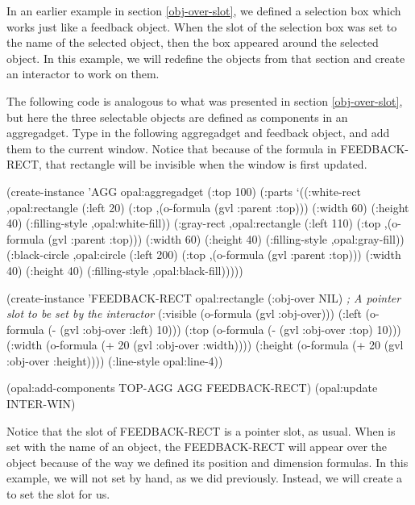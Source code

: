 In an earlier example in section \ref{obj-over-slot}, we defined a
selection box which works just like a feedback object.  When the
 slot of the selection box was set to the name of the
selected object, then the box appeared around the selected object.  In this
example, we will redefine the objects from that section and create an
interactor to work on them.

The following code is analogous to what was presented in section
\ref{obj-over-slot}, but here the three selectable objects are defined as
components in an aggregadget.  Type in the following aggregadget and
feedback object, and add them to the current window.  Notice that
because of the  formula in FEEDBACK-RECT, that rectangle
will be invisible when the window is first updated.

\begin{programexample}
(create-instance 'AGG opal:aggregadget
   (:top 100)
   (:parts
    `((:white-rect ,opal:rectangle
                   (:left 20)
                   (:top ,(o-formula (gvl :parent :top)))
                   (:width 60)
                   (:height 40)
                   (:filling-style ,opal:white-fill))
      (:gray-rect ,opal:rectangle
                  (:left 110)
                  (:top ,(o-formula (gvl :parent :top)))
                  (:width 60)
                  (:height 40)
                  (:filling-style ,opal:gray-fill))
      (:black-circle ,opal:circle
                     (:left 200)
                     (:top ,(o-formula (gvl :parent :top)))
                     (:width 40)
                     (:height 40)
                     (:filling-style ,opal:black-fill)))))

(create-instance 'FEEDBACK-RECT opal:rectangle
   (:obj-over NIL)  {\it ; A pointer slot to be set by the interactor}
   (:visible (o-formula (gvl :obj-over)))
   (:left (o-formula (- (gvl :obj-over :left) 10)))
   (:top (o-formula (- (gvl :obj-over :top) 10)))
   (:width (o-formula (+ 20 (gvl :obj-over :width))))
   (:height (o-formula (+ 20 (gvl :obj-over :height))))
   (:line-style opal:line-4))

(opal:add-components TOP-AGG AGG FEEDBACK-RECT)
(opal:update INTER-WIN)
\end{programexample}

Notice that the  slot of FEEDBACK-RECT is a pointer
slot, as usual.  When  is set with the name of an
object, the FEEDBACK-RECT will appear over the object because of the
way we defined its position and dimension formulas.  In this example,
we will not set  by hand, as we did previously.
Instead, we will create a  to set the slot for us.

